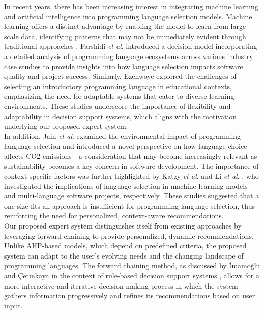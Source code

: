 \documentclass[conference]{IEEEtran}
\begin{document}
\indent In recent years, there has been increasing interest in integrating machine learning and artificial intelligence into programming language selection models. Machine learning offers a distinct advantage by enabling the model to learn from large scale data, identifying patterns that may not be immediately evident through traditional approaches \cite{Hsieh2014}. Farshidi \textit {et al}. \cite{Farshidi2021} introduced a decision model incorporating a detailed analysis of programming language ecosystems across various industry case studies to provide insights into how language selection impacts software quality and project success. Similarly, Ezenwoye \cite{Ezenwoye2018} explored the challenges of selecting an introductory programming language in educational contexts, emphasizing the need for adaptable systems that cater to diverse learning environments. These studies underscore the importance of flexibility and adaptability in decision support systems, which aligns with the motivation underlying our proposed expert system. \\
\indent In addition, Jain \textit {et al}. \cite{Jain2020} examined the environmental impact of programming language selection and introduced a novel perspective on how language choice affects CO2 emissions—a consideration that may become increasingly relevant as sustainability becomes a key concern in software development. The importance of context-specific factors was further highlighted by Katzy \textit {et al}. \cite{Katzy2023} and Li \textit {et al}. \cite{Li2021}, who investigated the implications of language selection in machine learning models and multi-language software projects, respectively. These studies suggested that a one-size-fits-all approach is insufficient for programming language selection, thus reinforcing the need for personalized, context-aware recommendations. \\
\indent Our proposed expert system distinguishes itself from existing approaches by leveraging forward chaining to provide personalized, dynamic recommendations. Unlike AHP-based models, which depend on predefined criteria, the proposed system can adapt to the user’s evolving needs and the changing landscape of programming languages. The forward chaining method, as discussed by \.{I}mamo\u{g}lu and Çetinkaya in the context of rule-based decision support systems \cite{Imamoglu2017}, allows for a more interactive and iterative decision making process in which the system gathers information progressively and refines its recommendations based on user input. \\
\end{document}
